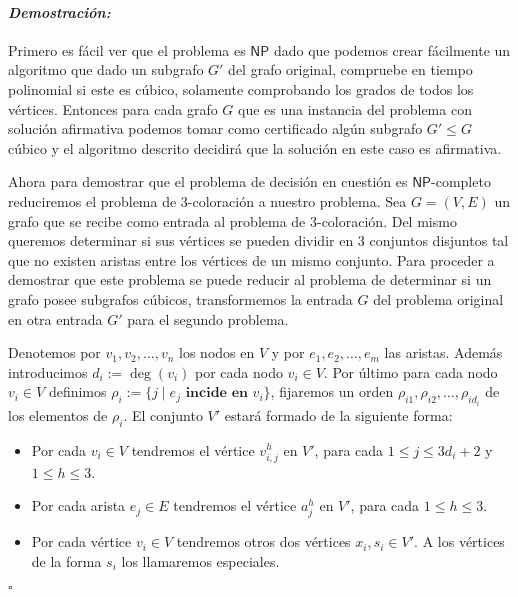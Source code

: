 \documentclass[10pt]{amsart}
\theoremstyle{definition}
\numberwithin{equation}{section}
\newenvironment{myproof} {\paragraph{\emph{Demostraci\'on:}}}{\hfill$\square$}
\begin{document}
\begin{myproof}
	Primero es f\'acil ver que el problema es $\mathsf{NP}$ dado que podemos crear f\'acilmente un algoritmo que dado un subgrafo $G'$ del grafo original, compruebe en tiempo polinomial si este es c\'ubico, solamente comprobando los grados de todos los v\'ertices. Entonces para cada grafo $G$ que es una instancia del problema con soluci\'on afirmativa podemos tomar como certificado alg\'un subgrafo $G' \le G$ c\'ubico y el algoritmo descrito decidir\'a que la soluci\'on en este caso es afirmativa.
	
	Ahora para demostrar que el problema de decisi\'on en cuesti\'on es $\mathsf{NP}$-completo reduciremos el problema de $3$-coloraci\'on a nuestro problema. Sea $G = (V,E)$ un grafo que se recibe como entrada al problema de $3$-coloraci\'on. Del mismo queremos determinar si sus v\'ertices se pueden dividir en $3$ conjuntos disjuntos tal que no existen aristas entre los v\'ertices de un mismo conjunto. Para proceder a demostrar que este problema se puede reducir al problema de  determinar si un grafo posee subgrafos c\'ubicos, transformemos la entrada $G$ del problema original en otra entrada $G'$ para el segundo problema. 
	
	Denotemos por $v_1, v_2, \dots, v_n$ los nodos en $V$ y por $e_1, e_2, \dots, e_m$ las aristas. Adem\'as introducimos $d_i := \deg(v_i)$ por cada nodo $v_i \in V$. Por \'ultimo para cada nodo $v_i \in V$ definimos $\rho_i := \{j \mid e_j \textbf{ incide en $v_i$}\}$, fijaremos un orden $\rho_{i1}, \rho_{i2}, \dots, \rho_{id_i}$ de los elementos de $\rho_i$. El conjunto $V'$ estar\'a formado de la siguiente forma:
	\begin{itemize}
		\item Por cada $v_i \in V$ tendremos el v\'ertice $v_{i,j}^h$ en $V'$, para cada $1 \le j \le 3d_i + 2$ y $1 \le h \le 3$.
		\item Por cada arista $e_j \in E$ tendremos el  v\'ertice $a_j^h$ en $V'$, para cada $1 \le h \le 3$.
		\item Por cada v\'ertice $v_i \in V$ tendremos otros dos v\'ertices $x_i, s_i \in V'$. A los v\'ertices de la forma $s_i$ los llamaremos especiales.
	\end{itemize}


\end{myproof}
\end{document}
